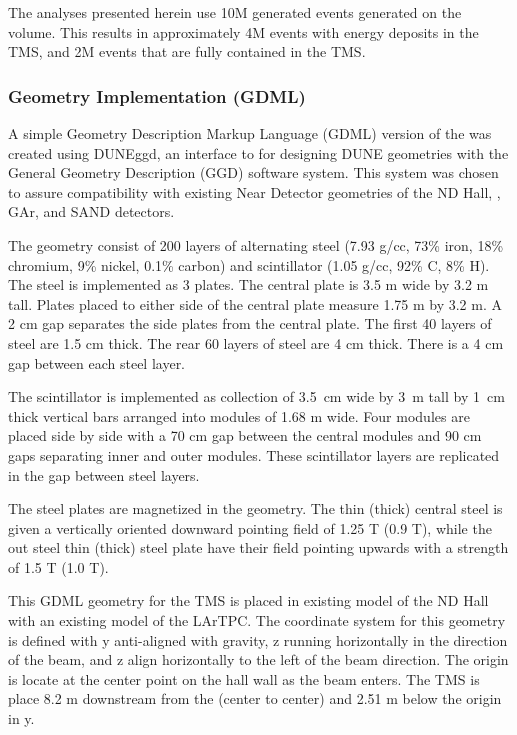The analyses presented herein use 10M generated events generated on the  volume. This results in approximately 4M events with energy deposits in the TMS, and 2M events that are fully contained in the TMS. 

\subsubsection{Geometry Implementation (GDML)}
A simple Geometry Description Markup Language (GDML) version of the  was created using DUNEggd, an interface to for designing DUNE geometries with the General Geometry Description (GGD) software system. This system was chosen to assure compatibility with existing Near Detector geometries of the ND Hall, , GAr, and SAND detectors. 

The geometry consist of 200 layers of alternating steel (7.93 g/cc, 73\% iron, 18\% chromium, 9\% nickel, 0.1\% carbon) and scintillator (1.05 g/cc, 92\% C, 8\% H). The steel is implemented as 3 plates. The central plate is 3.5 m wide by 3.2 m tall. Plates placed to either side of the central plate measure 1.75 m by 3.2 m. A 2 cm gap separates the side plates from the central plate. The first 40 layers of steel are 1.5 cm thick. The rear 60 layers of steel are 4 cm thick. There is a 4 cm gap between each steel layer. 

The scintillator is implemented as collection of 3.5~cm wide by 3~m tall by 1~cm thick vertical bars arranged into modules of 1.68 m wide. Four modules are placed side by side with a 70 cm gap between the central modules and 90 cm gaps separating inner and outer modules. These scintillator layers are replicated in the gap between steel layers.  

The steel plates are magnetized in the geometry. The thin (thick) central steel is given a vertically oriented downward pointing field of 1.25 T (0.9 T), while the out steel thin (thick) steel plate have their field pointing upwards with a strength of 1.5 T (1.0 T).

This GDML geometry for the TMS is placed in existing model of the ND Hall with an existing model of the LArTPC. The coordinate system for this geometry is defined with y anti-aligned with gravity, z running horizontally in the direction of the beam, and z align horizontally to the left of the beam direction. The origin is locate at the center point on the hall wall as the beam enters. The TMS is place 8.2 m downstream from the  (center to center) and 2.51 m below the origin in y.   

